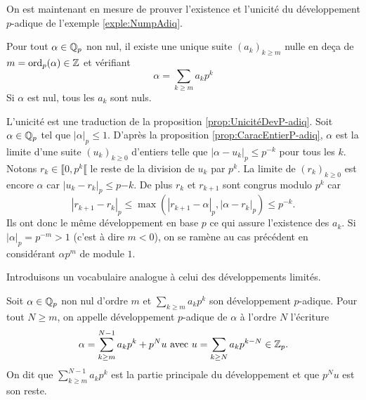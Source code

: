 \noindent On est maintenant en mesure de prouver l'existence et l'unicité du développement $p$-adique de l'exemple \ref{exple:NumpAdiq}.
\label{prop:NumpAdiq}
\begin{propn}
 Pour tout $\alpha \in \mathbb{Q}_p$ non nul, il existe une unique suite $(a_k)_{k\geq m}$ nulle en deça de $m = \mathop{\mathrm{ord}}_p(\alpha) \in \mathbb{Z}$ et vérifiant
 \begin{displaymath}
  \alpha = \sum_{k\geq m} a_k p^k
 \end{displaymath}
 Si $\alpha$ est nul, tous les $a_k$ sont nuls.
\end{propn}
\begin{demo}
L'unicité est une traduction de la proposition \ref{prop:UnicitéDevP-adiq}.\newline
Soit $\alpha \in \mathbb{Q}_p$ tel que $|\alpha|_p \leq 1$. D'après la proposition \ref{prop:CaracEntierP-adiq}, $\alpha$ est la limite d'une suite $(u_k)_{k\geq 0}$ d'entiers telle que $|\alpha - u_k|_p \leq p^{-k}$ pour tous les $k$. Notons $r_k \in \llbracket 0, p^k \llbracket$ le reste de la division de $u_k$ par $p^k$. La limite de $(r_k)_{k\geq 0}$ est encore $\alpha$ car $|u_k - r_k|_p \leq p{-k}$. De plus $r_k$ et $r_{k+1}$ sont congrus modulo $p^k$ car
\begin{displaymath}
 |r_{k+1} - r_k|_p \leq \max\left(|r_{k+1} - \alpha|_p, |\alpha - r_k|_p\right) \leq p^{-k}.
\end{displaymath}
Ils ont donc le même développement en base $p$ ce qui assure l'existence des $a_k$.\newline
Si $|\alpha|_p = p^{-m} > 1$ (c'est à dire $m<0$), on se ramène au cas précédent en considérant $\alpha p^m$ de module $1$.
\end{demo}
\noindent Introduisons un vocabulaire analogue à celui des développements limités.
\begin{defin}\label{Def:devlp-adiqOrdreN}
 Soit $\alpha \in \mathbb{Q}_p$ non nul d'ordre $m$ et $\sum_{k\geq m} a_k p^k$ son développement $p$-adique. Pour tout $N \geq m$, on appelle développement $p$-adique de $\alpha$ à l'ordre $N$ l'écriture
 \begin{displaymath}
  \alpha = \sum_{k\geq m}^{N-1} a_k p^k + p^Nu\text{ avec } u =\sum_{k\geq N} a_k p^{k-N} \in \mathbb{Z}_p.
 \end{displaymath}
 On dit que $\sum_{k\geq m}^{N-1} a_k p^k$ est la partie principale du développement et que $p^Nu$ est son reste.
\end{defin}

